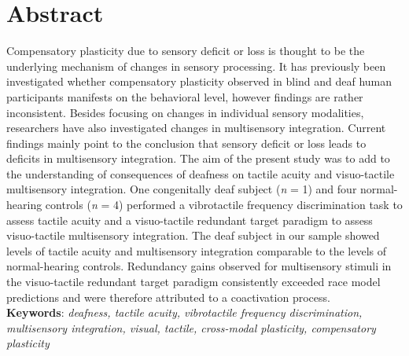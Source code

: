 \documentclass[12pt]{article}
\begin{document}
\section{Abstract}
Compensatory plasticity due to sensory deficit or loss is thought to be the underlying mechanism of changes in sensory processing. It has previously been investigated whether compensatory plasticity observed in blind and deaf human participants manifests on the behavioral level, however findings are rather inconsistent. Besides focusing on changes in individual sensory modalities, researchers have also investigated changes in multisensory integration. Current findings mainly point to the conclusion that sensory deficit or loss leads to deficits in multisensory integration. The aim of the present study was to add to the understanding of consequences of deafness on tactile acuity and visuo-tactile multisensory integration. One congenitally deaf subject (\textit{n} = 1) and four normal-hearing controls (\textit{n} = 4) performed a vibrotactile frequency discrimination task to assess tactile acuity and a visuo-tactile redundant target paradigm to assess visuo-tactile multisensory integration. The deaf subject in our sample showed levels of tactile acuity and multisensory integration comparable to the levels of normal-hearing controls. Redundancy gains observed for multisensory stimuli in the visuo-tactile redundant target paradigm consistently exceeded race model predictions and were therefore attributed to a coactivation process. 
%
\vspace{1.0cm}\\
\textbf{Keywords}:\textit{ deafness, tactile acuity, vibrotactile frequency discrimination, multisensory integration, visual, tactile, cross-modal plasticity, compensatory plasticity}
%
\end{document}
